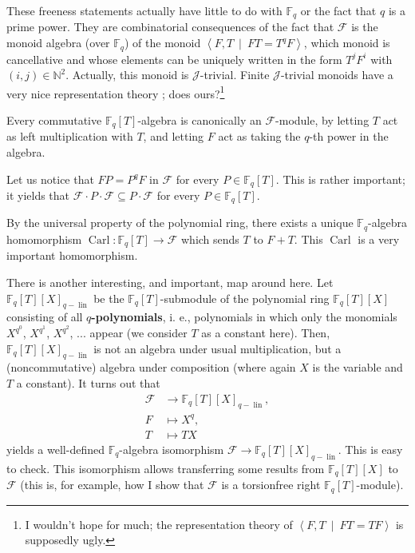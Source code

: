 \documentclass[numbers=enddot,12pt,final,onecolumn,notitlepage]{scrartcl}%
\theoremstyle{definition}
\begin{document}
These freeness statements actually have little to do with $\mathbb{F}_{q}$ or
the fact that $q$ is a prime power. They are combinatorial consequences of the
fact that $\mathcal{F}$ is the monoid algebra (over $\mathbb{F}_{q}$) of the
monoid $\left\langle F,T\ \mid\ FT=T^{q}F\right\rangle $, which monoid is
cancellative and whose elements can be uniquely written in the form
$T^{j}F^{i}$ with $\left(  i,j\right)  \in\mathbb{N}^{2}$. Actually, this
monoid is $\mathcal{J}$-trivial. Finite $\mathcal{J}$-trivial monoids have a
very nice representation theory \cite{dhns}; does ours?\footnote{I wouldn't
hope for much; the representation theory of $\left\langle F,T\ \mid
\ FT=TF\right\rangle $ is supposedly ugly.}

Every commutative $\mathbb{F}_{q}\left[  T\right]  $-algebra is canonically an
$\mathcal{F}$-module, by letting $T$ act as left multiplication with $T$, and
letting $F$ act as taking the $q$-th power in the algebra.

Let us notice that $FP=P^{q}F$ in $\mathcal{F}$ for every $P\in\mathbb{F}%
_{q}\left[  T\right]  $. This is rather important; it yields that
$\mathcal{F}\cdot P\cdot\mathcal{F}\subseteq P\cdot\mathcal{F}$ for every
$P\in\mathbb{F}_{q}\left[  T\right]  $.

By the universal property of the polynomial ring, there exists a unique
$\mathbb{F}_{q}$-algebra homomorphism $\operatorname*{Carl}:\mathbb{F}%
_{q}\left[  T\right]  \rightarrow\mathcal{F}$ which sends $T$ to $F+T$. This
$\operatorname*{Carl}$ is a very important homomorphism.

There is another interesting, and important, map around here. Let
$\mathbb{F}_{q}\left[  T\right]  \left[  X\right]  _{q-\operatorname*{lin}}$
be the $\mathbb{F}_{q}\left[  T\right]  $-submodule of the polynomial ring
$\mathbb{F}_{q}\left[  T\right]  \left[  X\right]  $ consisting of all
$q$\textbf{-polynomials}, i. e., polynomials in which only the monomials
$X^{q^{0}}$, $X^{q^{1}}$, $X^{q^{2}}$, $...$ appear (we consider $T$ as a
constant here). Then, $\mathbb{F}_{q}\left[  T\right]  \left[  X\right]
_{q-\operatorname*{lin}}$ is not an algebra under usual multiplication, but a
(noncommutative) algebra under composition (where again $X$ is the variable
and $T$ a constant). It turns out that%
\begin{align*}
\mathcal{F}  &  \rightarrow\mathbb{F}_{q}\left[  T\right]  \left[  X\right]
_{q-\operatorname*{lin}},\\
F  &  \mapsto X^{q},\\
T  &  \mapsto TX
\end{align*}
yields a well-defined $\mathbb{F}_{q}$-algebra isomorphism $\mathcal{F}%
\rightarrow\mathbb{F}_{q}\left[  T\right]  \left[  X\right]
_{q-\operatorname*{lin}}$. This is easy to check. This isomorphism allows
transferring some results from $\mathbb{F}_{q}\left[  T\right]  \left[
X\right]  $ to $\mathcal{F}$ (this is, for example, how I show that
$\mathcal{F}$ is a torsionfree right $\mathbb{F}_{q}\left[  T\right]  $-module).
\end{document}
